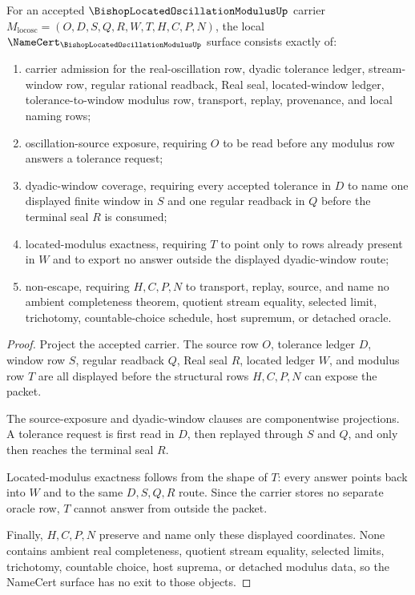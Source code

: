 \begin{theorem}
\label{thm:bishop-located-oscillation-modulus-namecert-obligations}
For an accepted $\BishopLocatedOscillationModulusUp$ carrier $M_{\mathrm{locosc}}=(O,D,S,Q,R,W,T,H,C,P,N)$, the local $\NameCert_{\BishopLocatedOscillationModulusUp}$ surface consists exactly of:
\begin{enumerate}
\item carrier admission for the real-oscillation row, dyadic tolerance ledger, stream-window row, regular rational readback, Real seal, located-window ledger, tolerance-to-window modulus row, transport, replay, provenance, and local naming rows;
\item oscillation-source exposure, requiring $O$ to be read before any modulus row answers a tolerance request;
\item dyadic-window coverage, requiring every accepted tolerance in $D$ to name one displayed finite window in $S$ and one regular readback in $Q$ before the terminal seal $R$ is consumed;
\item located-modulus exactness, requiring $T$ to point only to rows already present in $W$ and to export no answer outside the displayed dyadic-window route;
\item non-escape, requiring $H,C,P,N$ to transport, replay, source, and name no ambient completeness theorem, quotient stream equality, selected limit, trichotomy, countable-choice schedule, host supremum, or detached oracle.
\end{enumerate}
\end{theorem}
\begin{proof}
Project the accepted carrier. The source row $O$, tolerance ledger $D$, window row $S$, regular readback $Q$, Real seal $R$, located ledger $W$, and modulus row $T$ are all displayed before the structural rows $H,C,P,N$ can expose the packet.

The source-exposure and dyadic-window clauses are componentwise projections. A tolerance request is first read in $D$, then replayed through $S$ and $Q$, and only then reaches the terminal seal $R$.

Located-modulus exactness follows from the shape of $T$: every answer points back into $W$ and to the same $D,S,Q,R$ route. Since the carrier stores no separate oracle row, $T$ cannot answer from outside the packet.

Finally, $H,C,P,N$ preserve and name only these displayed coordinates. None contains ambient real completeness, quotient stream equality, selected limits, trichotomy, countable choice, host suprema, or detached modulus data, so the NameCert surface has no exit to those objects.
\end{proof}


